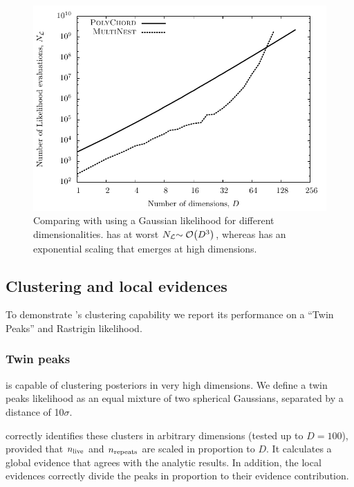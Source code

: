\begin{figure}[tp]
  \centering
  \includegraphics[width=\columnwidth]{chapters/polychord/figures/gaussian}
  \caption{Comparing \PolyChord{} with \MultiNest{} using a
  Gaussian likelihood for different dimensionalities. \PolyChord{} has at worst \(N_{\mathcal{L}}{\sim\mathcal{O}{\left(D^3\right)}}\), whereas \MultiNest{} has an exponential scaling that emerges at high dimensions.\label{fig:pc:gaussian}
}
\end{figure}

\subsection{Clustering and local evidences}
\label{sec:pc:loc_ev}
To demonstrate \PolyChord{}'s clustering capability we report its performance on a ``Twin Peaks'' and Rastrigin likelihood.

\subsubsection{Twin peaks}
\label{sec:pc:twin_peaks}
\PolyChord{} is capable of clustering posteriors in very high dimensions. We define a twin peaks likelihood as an equal mixture of two spherical Gaussians, separated by a distance of 10\(\sigma\).

\PolyChord{} correctly identifies these clusters in arbitrary dimensions (tested up to \(D=100\)), provided that \(n_{\mathrm{live}}\) and \(n_{\mathrm{repeats}}\) are scaled in proportion to \(D\). It calculates a global evidence that agrees with the analytic results. In addition, the local evidences correctly divide the peaks in proportion to their evidence contribution.

